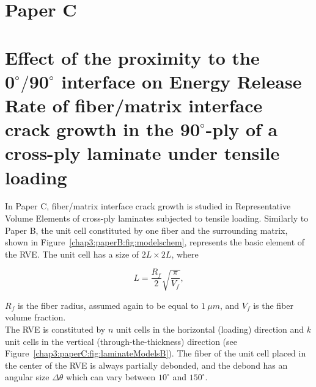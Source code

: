 \section{Paper C}
\section*{Effect of the proximity to the $\mathbf{0^{\circ}/90^{\circ}}$ interface on Energy Release Rate of fiber/matrix interface crack growth in the  $\mathbf{90^{\circ}}$-ply of a cross-ply laminate under tensile loading}

In Paper C, fiber/matrix interface crack growth is studied in Representative Volume Elements of cross-ply laminates subjected to tensile loading. Similarly to Paper B, the unit cell constituted by one fiber and the surrounding matrix, shown in Figure~\ref{chap3:paperB:fig:modelschem}, represents the basic element of the RVE. The unit cell has a size of $2L\times2L$, where

\begin{equation}\label{chap3:paperC:eq:LVf}
L=\frac{R_{f}}{2}\sqrt{\frac{\pi}{V_{f}}},
\end{equation}

$R_{f}$ is the fiber radius, assumed again to be equal to $1\ \mu m$, and $V_{f}$ is the fiber volume fraction.\\
The RVE is constituted by $n$ unit cells in the horizontal (loading) direction and $k$ unit cells in the vertical (through-the-thickness) direction (see Figure~\ref{chap3:paperC:fig:laminateModelsB}). The fiber of the unit cell placed in the center of the RVE is always partially debonded, and the debond has an angular size $\Delta\theta$ which can vary between $10^{\circ}$ and $150^{\circ}$.

